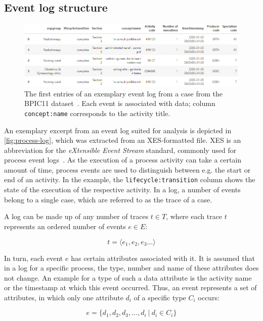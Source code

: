 \subsection{Event log structure}
\label{sec:log-structure}
\begin{figure}
    \centering
    \includegraphics[width=\textwidth]{gfx/process-log.png}
    \caption[An exemplary excerpt from BPIC11]{The first entries of an exemplary event log from a case from the BPIC11 dataset~\cite{BPIC2011}. Each event is associated with data; column \texttt{concept:name} corresponds to the activity title.}
    \label{fig:process-log}
\end{figure}

An exemplary excerpt from an event log suited for analysis is depicted in \autoref{fig:process-log}, which was extracted from an XES-formatted file.
XES is an abbreviation for the \textit{eXtensible Event Stream} standard, commonly used for process event logs~\cite{gunther2013xes}. As the execution of a process activity can take a certain amount of time, process events are used to distinguish between e.g. the start or end of an activity. In the example, the \verb=lifecycle:transition= column shows the state of the execution of the respective activity. In a log, a number of events belong to a single case, which are referred to as the trace of a case.

A log can be made up of any number of traces $t \in T$, where each trace $t$ represents an ordered number of events $e \in E$:

$$ t = \langle e_1, e_2, e_3 \dots \rangle $$

In turn, each event $e$ has certain attributes associated with it. It is assumed that in a log for a specific process, the type, number and name of these attributes does not change. An example for a type of such a data attribute is the activity name or the timestamp at which this event occurred. Thus, an event represents a set of attributes, in which only one attribute $d_i$ of a specific type $C_i$ occurs:

$$ e = \{ d_1, d_2, d_3, ..., d_i\ |\ d_i \in C_i \}$$

